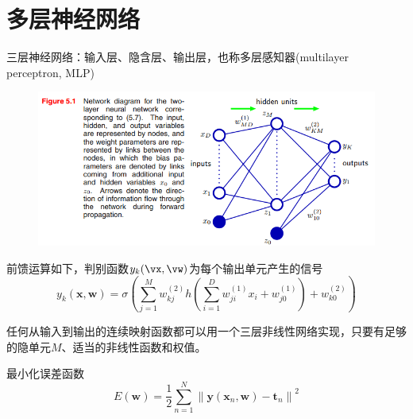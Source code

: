 
\section{多层神经网络} %
三层神经网络：输入层、隐含层、输出层，也称多层感知器(multilayer perceptron, MLP)
\begin{figure}[H]
\centering
\includegraphics[width=0.8\linewidth]{fig/forward_propagation.png}
\end{figure}

前馈运算如下，判别函数$y_k(\vx,\vw)$为每个输出单元产生的信号
\[y_{k}(\mathbf{x}, \mathbf{w})=\sigma\left(\sum_{j=1}^{M} w_{k j}^{(2)} h\left(\sum_{i=1}^{D} w_{j i}^{(1)} x_{i}+w_{j 0}^{(1)}\right)+w_{k 0}^{(2)}\right)\]

任何从输入到输出的连续映射函数都可以用一个三层非线性网络实现，只要有足够的隐单元$M$、适当的非线性函数和权值。

最小化误差函数
\[E(\mathbf{w})=\frac{1}{2} \sum_{n=1}^{N}\left\|\mathbf{y}\left(\mathbf{x}_{n}, \mathbf{w}\right)-\mathbf{t}_{n}\right\|^{2}\]

